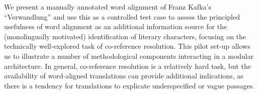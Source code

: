 We present a manually annotated word alignment of Franz Kafka's ``Verwandlung'' and use this as a controlled test case to assess the principled usefulness of word alignment as an additional information source for the (monolingually motivated) identification of literary characters, focusing on the technically well-explored task of co-reference resolution. This pilot set-up allows us to illustrate a number of methodological components interacting in a modular architecture. In general, co-reference resolution is a relatively hard task, but the availability of word-aligned translations can provide additional indications, as there is a tendency for translations to explicate underspecified or vague passages.
